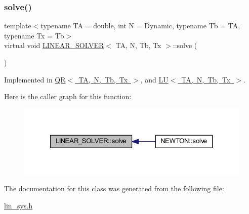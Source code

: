 \subsubsection{\texorpdfstring{solve()}{solve()}}
{\footnotesize\ttfamily template$<$typename TA = double, int N = Dynamic, typename Tb = TA, typename Tx = Tb$>$ \\
virtual void \mbox{\hyperlink{class_l_i_n_e_a_r___s_o_l_v_e_r}{L\+I\+N\+E\+A\+R\+\_\+\+S\+O\+L\+V\+ER}}$<$ TA, N, Tb, Tx $>$\+::solve (\begin{DoxyParamCaption}\item[{\mbox{\hyperlink{class_l_i_n_e_a_r___s_y_s_t_e_m}{L\+I\+N\+E\+A\+R\+\_\+\+S\+Y\+S\+T\+EM}}$<$ TA, N, Tb, Tx $>$ \&}]{ }\end{DoxyParamCaption})\hspace{0.3cm}{\ttfamily [pure virtual]}}



Implemented in \mbox{\hyperlink{class_q_r_ab8f49cec36214bdcd9fca78e89c3737e}{Q\+R$<$ T\+A, N, Tb, Tx $>$}}, and \mbox{\hyperlink{class_l_u_a624d7ff38645debae206313534516f49}{L\+U$<$ T\+A, N, Tb, Tx $>$}}.

Here is the caller graph for this function\+:
\nopagebreak
\begin{figure}[H]
\begin{center}
\leavevmode
\includegraphics[width=327pt]{class_l_i_n_e_a_r___s_o_l_v_e_r_a83c4d3b280e57814ec091dd9f8927c24_icgraph}
\end{center}
\end{figure}


The documentation for this class was generated from the following file\+:\begin{DoxyCompactItemize}
\item 
\mbox{\hyperlink{lin__sys_8h}{lin\+\_\+sys.\+h}}\end{DoxyCompactItemize}
